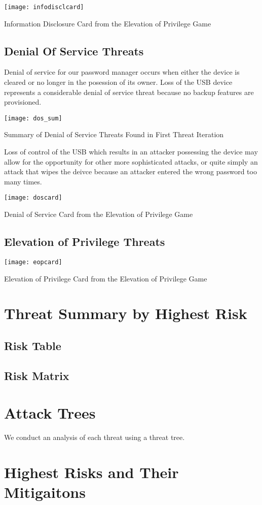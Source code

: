 \begin{marginfigure}[0.25in]%
\centering
  \texttt{[image: infodisclcard]}
  \caption{Information Disclosure Card from the Elevation of Privilege Game}
  \label{fig:spoofcard}
\end{marginfigure}


\subsection{Denial Of Service Threats}
Denial of service for our password manager occurs when either the device is
cleared or no longer in the posession of its owner.  Loss of the USB device
represents a considerable denial of service threat because no backup features
are provisioned.
\begin{table*}[ht]
    \centering
    \texttt{[image: dos\_sum]}
    \caption{Summary of Denial of Service Threats Found in First Threat Iteration}
    \label{tab:dossum}
\end{table*}

Loss of control of the USB which results in an attacker possessing the device
may allow for the opportunity for other more sophisticated attacks, or quite
simply an attack that wipes the deivce because an attacker entered the wrong
password too many times.


\begin{marginfigure}%
\centering
  \texttt{[image: doscard]}
  \caption{Denial of Service Card from the Elevation of Privilege Game}
  \label{fig:doscard}
\end{marginfigure}


\subsection{Elevation of Privilege Threats}

\begin{marginfigure}%
\centering
  \texttt{[image: eopcard]}
  \caption{Elevation of Privilege Card from the Elevation of Privilege Game}
  \label{fig:eopcard}
\end{marginfigure}


\section{Threat Summary by Highest Risk}

\subsection{Risk Table}

\subsection{Risk Matrix}

\section{Attack Trees}
We conduct an analysis of each threat using a threat tree.

\section{Highest Risks and Their Mitigaitons}
